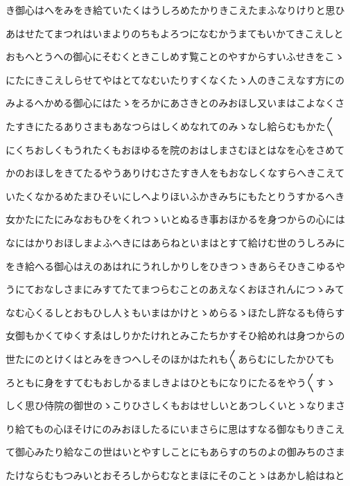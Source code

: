 \documentclass[a4paper,11pt,landscape]{ltjtarticle}
\begin{document}
\par\medskip
き御心はへをみをき給ていたくはうしろめたかりきこえたまふなりけりと思ひ
\par\medskip
あはせたてまつれはいまよりのちもよろつになむかうまてもいかてきこえしと
\par\medskip
おもへとうへの御心にそむくときこしめす覧ことのやすからすいふせきをこゝ
\par\medskip
にたにきこえしらせてやはとてなむいたりすくなくたゝ人のきこえなす方にの
\par\medskip
みよるへかめる御心にはたゝをろかにあさきとのみおほし又いまはこよなくさ
\par\medskip
たすきにたるありさまもあなつらはしくめなれてのみゝなし給らむもかた〱
\par\medskip
にくちおしくもうれたくもおほゆるを院のおはしまさむほとはなを心をさめて
\par\medskip
かのおほしをきてたるやうありけむさたすき人をもおなしくなすらへきこえて
\par\medskip
いたくなかるめたまひそいにしへよりほいふかきみちにもたとりうすかるへき
\par\medskip
女かたにたにみなおもひをくれつゝいとぬるき事おほかるを身つからの心には
\par\medskip
なにはかりおほしまよふへきにはあらねといまはとすて給けむ世のうしろみに
\par\medskip
をき給へる御心はえのあはれにうれしかりしをひきつゝきあらそひきこゆるや
\par\medskip
うにておなしさまにみすてたてまつらむことのあえなくおほされんにつゝみて
\par\medskip
なむ心くるしとおもひし人〻もいまはかけとゝめらるゝほたし許なるも侍らす
\par\medskip
女御もかくてゆくすゑはしりかたけれとみこたちかすそひ給めれは身つからの
\par\medskip
世たにのとけくはとみをきつへしそのほかはたれも〱あらむにしたかひても
\par\medskip
ろともに身をすてむもおしかるましきよはひともになりにたるをやう〱すゝ
\par\medskip
しく思ひ侍院の御世のゝこりひさしくもおはせしいとあつしくいとゝなりまさ
\par\medskip
り給てもの心ほそけにのみおほしたるにいまさらに思はすなる御なもりきこえ
\par\medskip
て御心みたり給なこの世はいとやすしことにもあらすのちのよの御みちのさま
\par\medskip
たけならむもつみいとおそろしからむなとまほにそのことゝはあかし給はねと
\par\medskip
\end{document}
